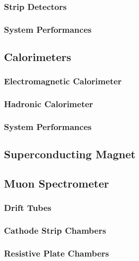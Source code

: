           \subsubsection{Strip Detectors}

          \subsubsection{System Performances}

      \subsection{Calorimeters}

          \subsubsection{Electromagnetic Calorimeter}

          \subsubsection{Hadronic Calorimeter}

          \subsubsection{System Performances}

      \subsection{Superconducting Magnet}

      \subsection{Muon Spectrometer}

          \subsubsection{Drift Tubes}

          \subsubsection{Cathode Strip Chambers}

          \subsubsection{Resistive Plate Chambers}

